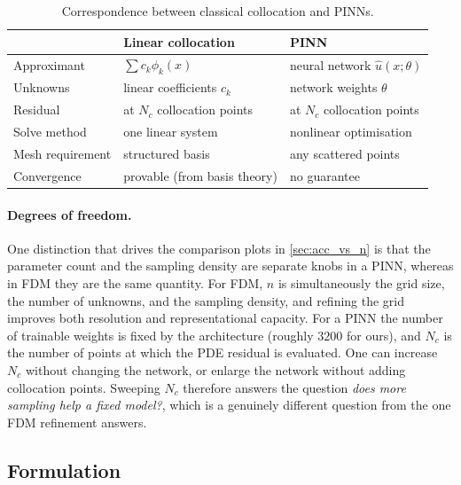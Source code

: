\documentclass[11pt]{article}
\theoremstyle{plain}
\theoremstyle{remark}
\begin{document}
\begin{table}[h]
\centering
\begin{tabular}{lll}
\toprule
 & \textbf{Linear collocation} & \textbf{PINN} \\
\midrule
Approximant       & $\sum c_k \phi_k(x)$        & neural network $\hat{u}(x;\theta)$ \\
Unknowns          & linear coefficients $c_k$   & network weights $\theta$  \\
Residual          & at $N_c$ collocation points & at $N_c$ collocation points \\
Solve method      & one linear system           & nonlinear optimisation \\
Mesh requirement  & structured basis            & any scattered points \\
Convergence       & provable (from basis theory) & no guarantee \\
\bottomrule
\end{tabular}
\caption{Correspondence between classical collocation and PINNs.}
\label{tab:collocation_vs_pinn}
\end{table}

\paragraph{Degrees of freedom.} One distinction that drives the
comparison plots in \cref{sec:acc_vs_n} is that the parameter count and
the sampling density are separate knobs in a PINN, whereas in FDM they
are the same quantity. For FDM, $n$ is simultaneously the grid size, the
number of unknowns, and the sampling density, and refining the grid
improves both resolution and representational capacity. For a PINN the
number of trainable weights is fixed by the architecture (roughly $3200$
for ours), and $N_c$ is the number of points at which the PDE residual is
evaluated. One can increase $N_c$ without changing the network, or enlarge
the network without adding collocation points. Sweeping $N_c$ therefore
answers the question \textit{does more sampling help a fixed model?}, which
is a genuinely different question from the one FDM refinement answers.


\subsection{Formulation}
\label{sec:pinn_form}
\end{document}

